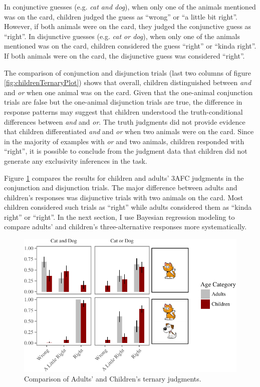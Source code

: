 \documentclass[oneside]{report}
\theoremstyle{definition}
\theoremstyle{definition}
\theoremstyle{definition}
\theoremstyle{remark}
\begin{document}
In conjunctive guesses (e.g. \emph{cat and dog}), when only one of the
animals mentioned was on the card, children judged the guess as
``wrong'' or ``a little bit right''. However, if both animals were on
the card, they judged the conjunctive guess as ``right''. In disjunctive
guesses (e.g. \emph{cat or dog}), when only one of the animals mentioned
was on the card, children considered the guess ``right'' or ``kinda
right''. If both animals were on the card, the disjunctive guess was
considered ``right''.

The comparison of conjunction and disjunction trials (last two columns
of figure \ref{fig:childrenTernaryPlot}) shows that overall, children
distinguished between \emph{and} and \emph{or} when one animal was on
the card. Given that the one-animal conjunction trials are false but the
one-animal disjunction trials are true, the difference in response
patterns may suggest that children understood the truth-conditional
differences between \emph{and} and \emph{or}. The truth judgments did
not provide evidence that children differentiated \emph{and} and
\emph{or} when two animals were on the card. Since in the majority of
examples with \emph{or} and two animals, children responded with
``right'', it is possible to conclude from the judgment data that
children did not generate any exclusivity inferences in the task.

Figure \ref{fig:childAdultComp} compares the results for children and
adults' 3AFC judgments in the conjunction and disjunction trials. The
major difference between adults and children's responses was disjunctive
trials with two animals on the card. Most children considered such
trials as ``right'' while adults considered them as ``kinda right'' or
``right''. In the next section, I use Bayesian regression modeling to
compare adults' and children's three-alternative responses more
systematically.
\begin{figure}[t]

{\centering \includegraphics{figs/childAdultComp-1} 

}

\caption{Comparison of Adults' and Children's ternary judgments.}\label{fig:childAdultComp}
\end{figure}
\end{document}
